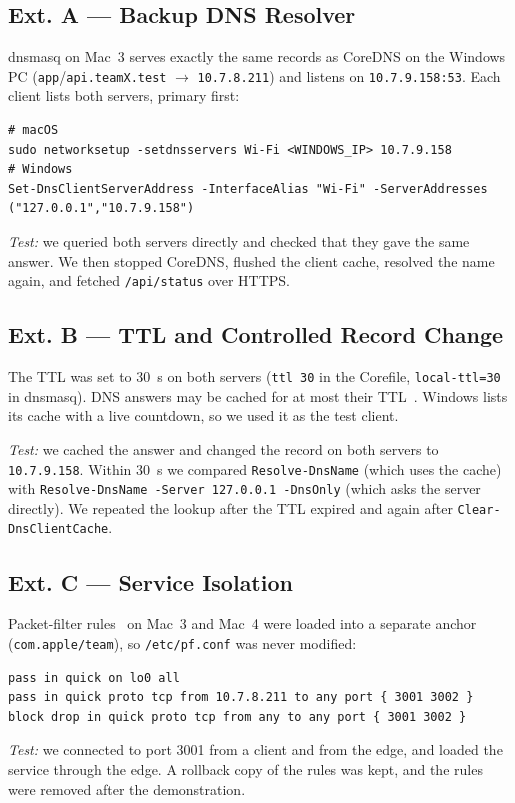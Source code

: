 \documentclass[conference]{IEEEtran}
\newcommand{\ip}[1]{\texttt{#1}}
\begin{document}
\subsection{Ext. A --- Backup DNS Resolver}
dnsmasq on Mac~3 serves exactly the same records as CoreDNS on the Windows PC (\texttt{app}/\texttt{api.teamX.test} $\rightarrow$ \ip{10.7.8.211}) and listens on \ip{10.7.9.158:53}. Each client lists both servers, primary first:
\begin{lstlisting}
# macOS
sudo networksetup -setdnsservers Wi-Fi <WINDOWS_IP> 10.7.9.158
# Windows
Set-DnsClientServerAddress -InterfaceAlias "Wi-Fi" -ServerAddresses ("127.0.0.1","10.7.9.158")
\end{lstlisting}
\textit{Test:} we queried both servers directly and checked that they gave the same answer. We then stopped CoreDNS, flushed the client cache, resolved the name again, and fetched \texttt{/api/status} over HTTPS.

\subsection{Ext. B --- TTL and Controlled Record Change}
The TTL was set to 30~s on both servers (\texttt{ttl 30} in the Corefile, \texttt{local-ttl=30} in dnsmasq). DNS answers may be cached for at most their TTL~\cite{rfc1035}. Windows lists its cache with a live countdown, so we used it as the test client.

\textit{Test:} we cached the answer and changed the record on both servers to \ip{10.7.9.158}. Within 30~s we compared \texttt{Resolve-DnsName} (which uses the cache) with \texttt{Resolve-DnsName -Server 127.0.0.1 -DnsOnly} (which asks the server directly). We repeated the lookup after the TTL expired and again after \texttt{Clear-DnsClientCache}.

\subsection{Ext. C --- Service Isolation}
Packet-filter rules~\cite{pf} on Mac~3 and Mac~4 were loaded into a separate anchor (\texttt{com.apple/team}), so \texttt{/etc/pf.conf} was never modified:
\begin{lstlisting}
pass in quick on lo0 all
pass in quick proto tcp from 10.7.8.211 to any port { 3001 3002 }
block drop in quick proto tcp from any to any port { 3001 3002 }
\end{lstlisting}
\textit{Test:} we connected to port 3001 from a client and from the edge, and loaded the service through the edge. A rollback copy of the rules was kept, and the rules were removed after the demonstration.
\end{document}
